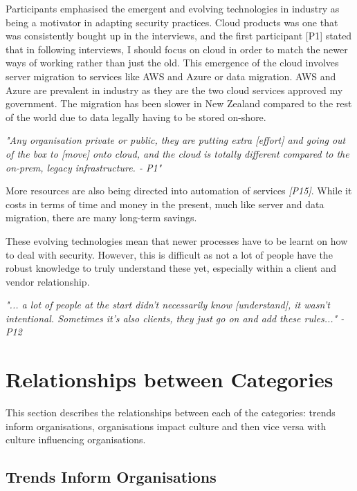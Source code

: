 Participants emphasised the emergent and evolving technologies in industry as being a motivator in adapting security practices. Cloud products was one that was consistently bought up in the interviews, and the first participant [P1] stated that in following interviews, I should focus on cloud in order to match the newer ways of working rather than just the old. This emergence of the cloud involves server migration to services like AWS and Azure or data migration. AWS and Azure are prevalent in industry as they are the two cloud services approved my government.  The migration has been slower in New Zealand compared to the rest of the world due to data legally having to be stored on-shore. 
\newline
\par
\textit{"Any organisation private or public, they are putting extra [effort] and going out of the box to [move] onto cloud, and the cloud is totally different compared to the on-prem, legacy infrastructure. - P1"}
\newline
\par 
More resources are also being directed into automation of services \textit{[P15]}. While it costs in terms of time and money in the present, much like server and data migration, there are many long-term savings. 
\newline
\par
These evolving technologies mean that newer processes have to be learnt on how to deal with security. However, this is difficult as not a lot of people have the robust knowledge to truly understand these yet, especially within a client and vendor relationship. 
\newline
\par
\textit{"... a lot of people at the start didn't necessarily know [understand], it wasn't intentional. Sometimes it's also clients, they just go on and add these rules..." -P12}

\section{Relationships between Categories}

\par This section describes the relationships between each of the categories: trends inform organisations, organisations impact culture and then vice versa with culture influencing organisations. 

\subsection{Trends Inform Organisations}

